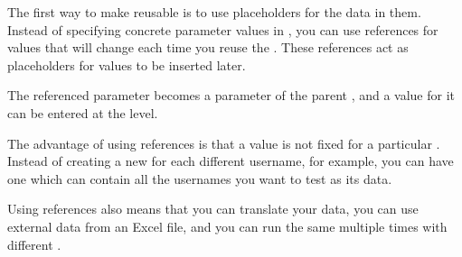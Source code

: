 \label{referencesconcepts}

The first way to make \gdcases{} reusable is to use placeholders for the data in them. Instead of specifying concrete parameter values in \gdsteps{}, you can use references for values that will change each time you reuse the \gdcase{}. These references act as placeholders for values to be inserted later. 

The referenced parameter becomes a parameter of the parent \gdcase{}, and a value for it can be entered at the \gdcase{} level. 

The advantage of using references is that a value is not fixed for a particular \gdcase{}. Instead of creating a new \gdcase{} for each different username, for example, you can have one \gdcase{} which can contain all the usernames you want to test as its data. 

Using references also means that you can translate your data, you can use external data from an Excel file, and you can run the same \gdcase{} multiple times with different . 

